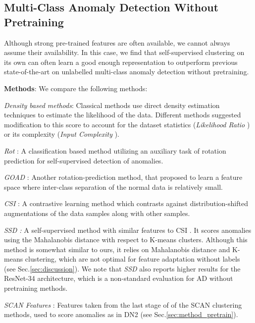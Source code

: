 \documentclass[runningheads]{llncs}
\begin{document}
\subsection{Multi-Class Anomaly Detection Without Pretraining}
\label{sec:res_self}

Although strong pre-trained features are often available, we cannot always assume their availability. In this case, we find that self-supervised clustering on its own can often learn a good enough representation to outperform previous state-of-the-art on unlabelled multi-class anomaly detection without pretraining.

\noindent\textbf{Methods}: We compare the following methods: 

\noindent\textit{Density based methods}: Classical methods use direct density estimation techniques to estimate the likelihood of the data. Different methods suggested modification to this score to account for the dataset statistics (\textit{Likelihood Ratio} \cite{ren2019likelihood}) or its complexity (\textit{Input Complexity} \cite{serra2019input}).

\noindent\textit{Rot} \cite{hendrycks2019using}: A classification based method utilizing an auxiliary task of rotation prediction for self-supervised detection of anomalies. 


\noindent\textit{GOAD} \cite{bergman2020classification}: Another rotation-prediction method, that proposed to learn a feature space where inter-class separation of the normal data is relatively small.

\noindent\textit{CSI} \cite{tack2020csi}: A contrastive learning method which contrasts against distribution-shifted augmentations of the data samples along with other samples.

\noindent\textit{SSD \cite{sehwag2021ssd}:} A self-supervised method with similar features to CSI \cite{tack2020csi}. It scores anomalies using the Mahalanobis distance with respect to K-means clusters. Although this method is somewhat similar to ours, it relies on Mahalanobis distance and K-means clustering, which are not optimal for feature adaptation without labels (see Sec.\ref{sec:discussion}). We note that \textit{SSD\cite{sehwag2021ssd}} also reports higher results for the ResNet-34 architecture, which is a non-standard evaluation for AD without pretraining methods. 

\noindent\textit{SCAN Features} \cite{van2020scan}: Features taken from the last stage of of the SCAN clustering methods, used to score anomalies as in DN2 (see Sec.\ref{sec:method_pretrain}). 
\end{document}
